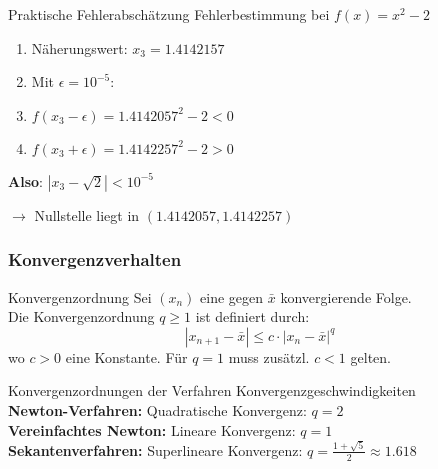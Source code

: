 \begin{example2}{Praktische Fehlerabschätzung} Fehlerbestimmung bei $f(x)=x^2-2$

    \begin{minipage}[t]{0.6\textwidth}
        
        \begin{enumerate}
            \item Näherungswert: $x_3 = 1.4142157$
            \item Mit $\epsilon = 10^{-5}$:
            \item $f(x_3-\epsilon) = 1.4142057^2 - 2 < 0$
            \item $f(x_3+\epsilon) = 1.4142257^2 - 2 > 0$
        \end{enumerate}
    \end{minipage}
    \begin{minipage}[t]{0.35\textwidth}
        \textbf{Also}: $|x_3-\sqrt{2}| < 10^{-5}$
        
        $\rightarrow$ Nullstelle liegt in $(1.4142057, 1.4142257)$
    \end{minipage}
\end{example2}

\subsubsection{Konvergenzverhalten}

\begin{definition}{Konvergenzordnung}
    Sei $(x_n)$ eine gegen $\bar{x}$ konvergierende Folge. \\
    Die Konvergenzordnung $q \geq 1$ ist definiert durch:
    \vspace{-2mm}\\
    $$|x_{n+1}-\bar{x}| \leq c \cdot |x_n-\bar{x}|^q$$
    wo $c > 0$ eine Konstante. Für $q = 1$ muss zusätzl. $c < 1$ gelten.
\end{definition}

\begin{theorem}{Konvergenzordnungen der Verfahren} Konvergenzgeschwindigkeiten
    \vspace{1mm}\\
    \textbf{Newton-Verfahren:} Quadratische Konvergenz: $q = 2$
    \vspace{1mm}\\
    \textbf{Vereinfachtes Newton:} Lineare Konvergenz: $q = 1$
    \vspace{1mm}\\
    \textbf{Sekantenverfahren:} Superlineare Konvergenz: $q = \frac{1+\sqrt{5}}{2} \approx 1.618$
\end{theorem}

